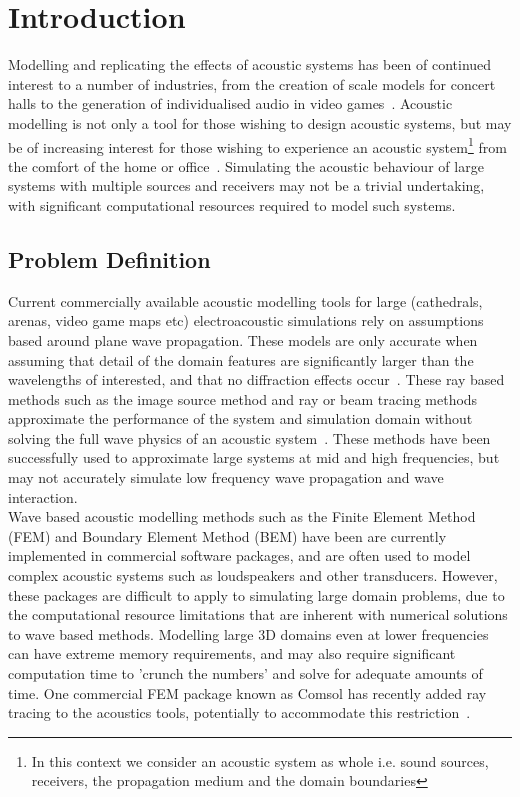 \chapter{Introduction}

Modelling and replicating the effects of acoustic systems has been of continued interest to a number of industries, from the creation of scale models for concert halls to the generation of individualised audio in video games~\cite{Rindel2000}. Acoustic modelling is not only a tool for those wishing to design acoustic systems, but may be of increasing interest for those wishing to experience an acoustic system\footnote{In this context we consider an acoustic system as whole i.e. sound sources, receivers, the propagation medium and the domain boundaries} from the comfort of the home or office~\cite{Tsingos2009}. Simulating the acoustic behaviour of large systems with multiple sources and receivers may not be a trivial undertaking, with significant computational resources required to model such systems. 

\section{Problem Definition}

Current commercially available acoustic modelling tools for large (cathedrals, arenas, video game maps etc) electroacoustic simulations rely on assumptions based around plane wave propagation. These models are only accurate when assuming that detail of the domain features are significantly larger than the wavelengths of interested, and that no diffraction effects occur~\cite{Schmalle2011}. These ray based methods such as the image source method and ray or beam tracing methods approximate the performance of the system and simulation domain without solving the full wave physics of an acoustic system~\cite{Monks1996a}. These methods have been successfully used to approximate large systems at mid and high frequencies, but may not accurately simulate low frequency wave propagation and wave interaction.\\

Wave based acoustic modelling methods such as the Finite Element Method (FEM) and Boundary Element Method (BEM) have been are currently implemented in commercial software packages, and are often used to model complex acoustic systems such as loudspeakers and other transducers. However, these packages are difficult to apply to simulating large domain problems, due to the computational resource limitations that are inherent with numerical solutions to wave based methods. Modelling large 3D domains even at lower frequencies can have extreme memory requirements, and may also require significant computation time to 'crunch the numbers' and solve for adequate amounts of time. One commercial FEM package known as Comsol has recently added ray tracing to the acoustics tools, potentially to accommodate this restriction~\cite{Jensen2016}.\\


